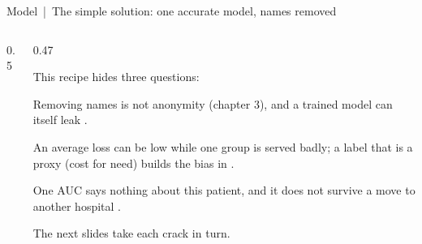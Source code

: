 \documentclass[aspectratio=169,10pt]{beamer}
\begin{document}
\begin{frame}{Model \,|\, The simple solution: one accurate model, names removed}
\begin{columns}[T]
\begin{column}{0.5\textwidth}
\begin{sfig}[0.6]
\end{sfig}
\end{column}
\begin{column}{0.47\textwidth}
{\footnotesize This recipe hides three questions:

\vspace{1mm}
 Removing names is not anonymity (chapter 3), and a trained model can itself leak .

\vspace{1mm}
 An average loss can be low while one group is served badly; a label that is a proxy (cost for need) builds the bias in .

\vspace{1mm}
 One AUC says nothing about this patient, and it does not survive a move to another hospital .

\vspace{1mm}
The next slides take each crack in turn.}
\end{column}
\end{columns}
\end{frame}
\end{document}
